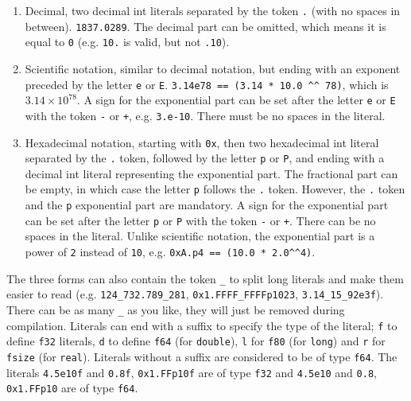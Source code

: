 \begin{enumerate}
\item Decimal, two decimal int literals separated by the token \texttt{.} (with
  no spaces in between). \texttt{1837.0289}. The decimal part can be omitted,
  which means it is equal to \texttt{0} (e.g. \texttt{10.} is valid, but not
  \texttt{.10}).

\item Scientific notation, similar to decimal notation, but ending with an
  exponent preceded by the letter \texttt{e} or \texttt{E}. \texttt{3.14e78 ==
    (3.14 * 10.0 \textasciicircum{}\textasciicircum{} 78)}, which is \(3.14
  \times 10^{78}\). A sign for the exponential part can be set after the letter
  \texttt{e} or \texttt{E} with the token \texttt{-} or \texttt{+}, e.g.
  \texttt{3.e-10}. There must be no spaces in the literal.

\item Hexadecimal notation, starting with \texttt{0x}, then two hexadecimal int
  literal separated by the \texttt{.} token, followed by the letter \texttt{p}
  or \texttt{P}, and ending with a decimal int literal representing the
  exponential part. The fractional part can be empty, in which case the letter
  \texttt{p} follows the \texttt{.} token. However, the \texttt{.} token and the
  \texttt{p} exponential part are mandatory. A sign for the exponential part can
  be set after the letter \texttt{p} or \texttt{P} with the token \texttt{-} or
  \texttt{+}. There can be no spaces in the literal. Unlike scientific notation,
  the exponential part is a power of \texttt{2} instead of \texttt{10}, e.g.
  \texttt{0xA.p4 == (10.0 * 2.0\textasciicircum{}\textasciicircum{}4)}.

\end{enumerate}

The three forms can also contain the token \texttt{\_} to split long literals
and make them easier to read (e.g. \texttt{124\_732.789\_281},
\texttt{0x1.FFFF\_FFFFp1023}, \texttt{3.14\_15\_92e3f}). There can be as many
\texttt{\_} as you like, they will just be removed during compilation. Literals
can end with a suffix to specify the type of the literal; \texttt{f} to define
\texttt{f32} literals, \texttt{d} to define \texttt{f64} (for \texttt{double}),
\texttt{l} for \texttt{f80} (for \texttt{long}) and \texttt{r} for
\texttt{fsize} (for \texttt{real}). Literals without a suffix are considered to
be of type \texttt{f64}. The literals \texttt{4.5e10f} and \texttt{0.8f},
\texttt{0x1.FFp10f} are of type \texttt{f32} and \texttt{4.5e10} and
\texttt{0.8}, \texttt{0x1.FFp10} are of type \texttt{f64}.

